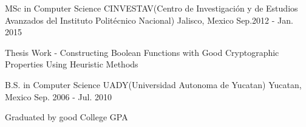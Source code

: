 


\begin{cventries}


\cventry
{MSc in Computer Science} %
{CINVESTAV(Centro de Investigación y de Estudios Avanzados del Instituto Politécnico Nacional)} %
{Jalisco, Mexico} %
{Sep.2012 - Jan. 2015} %
{ %
\begin{cvitems}
\item {Thesis Work - Constructing Boolean Functions with Good Cryptographic Properties Using Heuristic Methods}
\end{cvitems}
}

\cventry
{B.S. in Computer Science} %
{UADY(Universidad Autonoma de Yucatan)} %
{Yucatan, Mexico} %
{Sep. 2006 -  Jul. 2010} %
{ %
\begin{cvitems}
\item {Graduated by good College GPA}
\end{cvitems}
}


\end{cventries}
